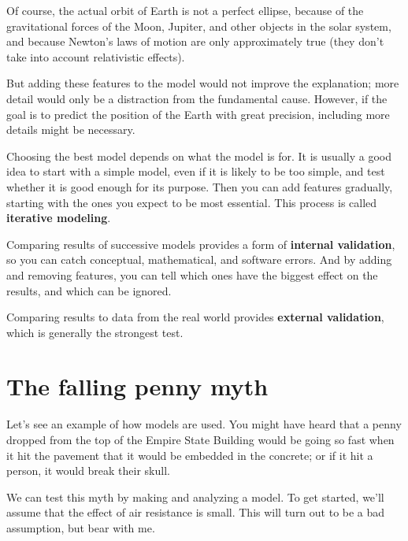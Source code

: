 \documentclass[12pt]{book}
\theoremstyle{exercise}
\begin{document}

Of course, the actual orbit of Earth is not a perfect ellipse, because of the gravitational forces of the Moon, Jupiter, and other objects in the solar system, and because Newton's laws of motion are only approximately true (they don't take into account relativistic effects).


But adding these features to the model would not improve the explanation; more detail would only be a distraction from the fundamental cause.  However, if the goal is to predict the position of the Earth with great precision, including more details might be necessary.  

Choosing the best model depends on what the model is for.  It is usually a good idea to start with a simple model, even if it is likely to be too simple, and test whether it is good enough for its purpose.  Then you can add features gradually, starting with the ones you expect to be most essential.  This process is called {\bf iterative modeling}.

Comparing results of successive models provides a form of {\bf internal validation}, so you can catch conceptual, mathematical, and software errors.  And by adding and removing features, you can tell which ones have the biggest effect on the results, and which can be ignored.


Comparing results to data from the real world provides {\bf external validation}, which is generally the strongest test.


\section{The falling penny myth}
\label{penny}

Let's see an example of how models are used.  You might have heard that a penny dropped from the top of the Empire State Building would be going so fast when it hit the pavement that it would be embedded in the concrete; or if it hit a person, it would break their skull.


We can test this myth by making and analyzing a model.  To get started, we'll assume that the effect of air resistance is small.  This will turn out to be a bad assumption, but bear with me.
\end{document}
